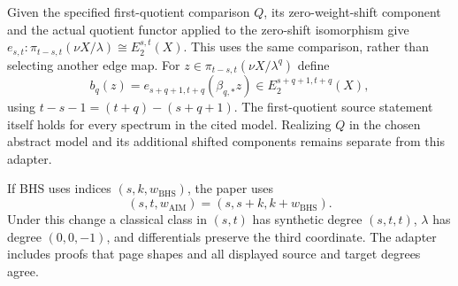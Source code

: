 \begin{definition}
  \label{def:first-lambda-quotient-comparison}
  \notready
  Given the specified first-quotient comparison $Q$, its zero-weight-shift
  component and the actual quotient functor applied to the zero-shift
  isomorphism give
  $e_{s,t}:\pi_{t-s,t}(\nu X/\lambda)\cong E_2^{s,t}(X)$.
  This uses the same comparison, rather than selecting another edge map.
  For $z\in\pi_{t-s,t}(\nu X/\lambda^q)$ define
  \[
    b_q(z)=e_{s+q+1,t+q}(\beta_{q,*}z)
      \in E_2^{s+q+1,t+q}(X),
  \]
  using $t-s-1=(t+q)-(s+q+1)$.
  The first-quotient source statement itself holds for every spectrum in
  the cited model. Realizing $Q$ in the chosen abstract model and its
  additional shifted components remains separate from this adapter.
\end{definition}

\begin{definition}
  \label{def:bhs-aim-regrading}
  \notready
  If BHS uses indices $(s,k,w_{\mathrm{BHS}})$, the paper uses
  \[
    (s,t,w_{\mathrm{AIM}})=(s,s+k,k+w_{\mathrm{BHS}}).
  \]
  Under this change a classical class in $(s,t)$ has synthetic degree
  $(s,t,t)$, $\lambda$ has degree $(0,0,-1)$, and differentials preserve the
  third coordinate.  The adapter includes proofs that page shapes and all
  displayed source and target degrees agree.
\end{definition}

